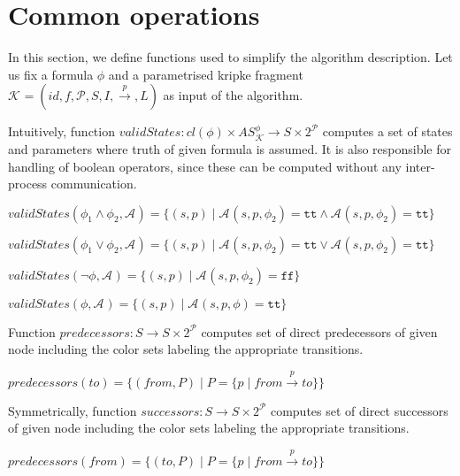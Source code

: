 \documentclass[12pt,oneside,draft]{fithesis2}
\newcommand{\as}[1][]{\ensuremath{\mathcal{A}_{#1}}}
\newcommand{\ASphi}{\ensuremath{AS_{\mathcal K}^\phi}}
\newcommand{\true}{\ensuremath{\texttt{tt}}}
\newcommand{\false}{\ensuremath{\texttt{ff}}}
\newcommand{\ks}[1][]{\ensuremath{\mathcal{K}_{#1}}}
\newcommand{\fullks}{\ensuremath{ \ks = (id, f, \params, S, I, \trans{p}, L) }}
\newcommand{\trans}[1]{\stackrel{#1}{\rightarrow}}
\newcommand{\params}{\mathcal{P}}
\begin{document}
    	\section{Common operations}
    		
    		In this section, we define functions used to simplify the algorithm description. Let us fix a formula $\phi$ and a parametrised kripke fragment $\fullks$ as input of the algorithm.
			
			Intuitively, function $validStates : cl(\phi) \times \ASphi \rightarrow S \times 2^\mathcal{P} $ computes a set of states and parameters where truth of given formula is assumed. It is also responsible for handling of boolean operators, since these can be computed without any inter-process communication. 
			
			\begin{center}
				$validStates(\phi_1 \wedge \phi_2, \as) = \{ (s, p) \mid \as(s, p, \phi_2) = \true \wedge \as(s, p, \phi_2) = \true \} $
			\end{center}
			
			\begin{center}
				$validStates(\phi_1 \vee \phi_2, \as) = \{ (s, p) \mid \as(s, p, \phi_2) = \true \vee \as(s, p, \phi_2) = \true \} $
			\end{center}
			
			\begin{center}
				$validStates(\neg\phi, \as) = \{ (s, p) \mid \as(s, p, \phi_2) = \false \} $
			\end{center}
			
			\begin{center}
				$validStates(\phi, \as) = \{ (s, p) \mid \as(s, p, \phi) = \true \} $
			\end{center}
			
			Function $predecessors : S \rightarrow S \times 2^\mathcal{P} $ computes set of direct predecessors of given node including the color sets labeling the appropriate transitions.
			
			\begin{center}
				$predecessors(to) = \{ (from, P) \mid P = \{ p \mid from \trans{p} to \} \} $
			\end{center}
			
			Symmetrically, function $successors : S \rightarrow S \times 2^\mathcal{P} $ computes set of direct successors of given node including the color sets labeling the appropriate transitions.

			\begin{center}
				$predecessors(from) = \{ (to, P) \mid P = \{ p \mid from \trans{p} to \} \} $
			\end{center}		
    
\end{document}
